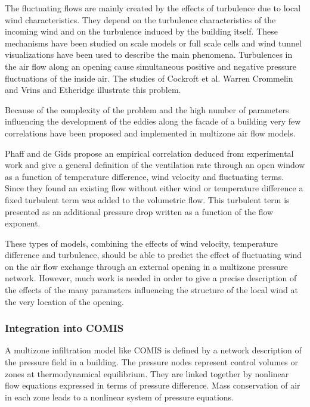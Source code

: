 \documentclass[12pt]{report}
\begin{document}
The fluctuating flows are mainly created by the effects of turbulence due to local
wind characteristics. They depend on the turbulence characteristics of the incoming wind
 and on the turbulence induced by the building itself. These mechanisms
have been studied on scale models or full scale cells and wind tunnel visualizations have
 been used to describe the main phenomena. Turbulences in the air
flow along an opening cause simultaneous positive and negative pressure fluctuations of the inside air.
The studies of Cockroft et al. \cite{cockroft_robertson_1976} Warren \cite{warren_1977} Crommelin
and Vrins \cite{crommelin_vrins_1988} and Etheridge \cite{etheridge_1984} illustrate this problem.

Because of the complexity of the problem and the high number of parameters
influencing the development of the eddies along the facade of a building very few
correlations have been proposed and implemented in multizone air flow models.

Phaff and de Gids \cite{phaff_degids_1980} propose an empirical correlation deduced from experimental
work and give a general definition of the ventilation rate through an open window as a function of
temperature difference, wind velocity and fluctuating terms.
Since they found an existing flow without either wind or temperature difference a
fixed turbulent term was added to the volumetric flow. This turbulent term is
presented as an additional pressure drop written as a function of the flow
exponent.

These types of models, combining the effects of wind velocity, temperature
difference and turbulence, should be able to predict the effect of fluctuating wind
on the air flow exchange through an external opening in a multizone pressure network.
However, much work is needed in order to give a precise description of the
effects of the many parameters influencing the structure of the local wind at the
very location of the opening. 

\subsubsection{Integration into COMIS}
A multizone infiltration model like COMIS is defined by a network description of
the pressure field in a building. The pressure nodes represent control volumes or
zones at thermodynamical equilibrium. They are linked together by nonlinear
flow equations expressed in terms of pressure difference. Mass conservation of air
in each zone leads to a nonlinear system of pressure equations.
\end{document}
